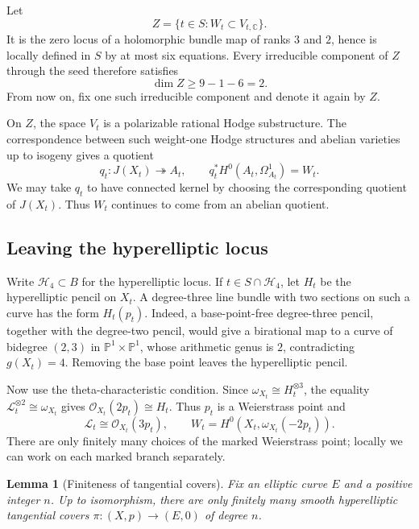 \documentclass[11pt]{amsart}
\newtheorem{lemma}{Lemma}[section]
\theoremstyle{remark}
\newcommand{\CC}{\mathbb C}
\newcommand{\PP}{\mathbb P}
\newcommand{\LL}{\mathcal L}
\numberwithin{equation}{section}
\begin{document}
Let
\[
Z=\{t\in S:W_t\subset V_{t,\CC}\}.
\]
It is the zero locus of a holomorphic bundle map of ranks $3$ and $2$,
hence is locally defined in $S$ by at most six equations. Every
irreducible component of $Z$ through the seed therefore satisfies
\begin{equation}\label{eq:lower-bound}
\dim Z\geq 9-1-6=2.
\end{equation}
From now on, fix one such irreducible component and denote it again by
$Z$.

On $Z$, the space $V_t$ is a polarizable rational Hodge substructure.
The correspondence between such weight-one Hodge structures and
abelian varieties up to isogeny gives a quotient
\[
q_t:J(X_t)\twoheadrightarrow A_t,\qquad
q_t^*H^0(A_t,\Omega_{A_t}^1)=W_t.
\]
We may take $q_t$ to have connected kernel by choosing the corresponding
quotient of $J(X_t)$. Thus $W_t$ continues to come from an abelian
quotient.

\subsection{Leaving the hyperelliptic locus}
Write $\mathcal H_4\subset B$ for the hyperelliptic locus. If
$t\in S\cap\mathcal H_4$, let $H_t$ be the hyperelliptic pencil on
$X_t$. A degree-three line bundle with two sections on such a curve
has the form $H_t(p_t)$. Indeed, a base-point-free degree-three pencil,
together with the degree-two pencil, would give a birational map to
a curve of bidegree $(2,3)$ in $\PP^1\times\PP^1$, whose arithmetic
genus is $2$, contradicting $g(X_t)=4$. Removing the base point leaves
the hyperelliptic pencil.

Now use the theta-characteristic condition. Since
$\omega_{X_t}\cong H_t^{\otimes3}$, the equality
$\LL_t^{\otimes2}\cong\omega_{X_t}$ gives
$\mathcal O_{X_t}(2p_t)\cong H_t$. Thus $p_t$ is a Weierstrass point and
\begin{equation}\label{eq:hyperelliptic-W}
\LL_t\cong\mathcal O_{X_t}(3p_t),\qquad
W_t=H^0(X_t,\omega_{X_t}(-2p_t)).
\end{equation}
There are only finitely many choices of the marked Weierstrass point;
locally we can work on each marked branch separately.

\begin{lemma}[Finiteness of tangential covers]\label{lem:finiteness}
Fix an elliptic curve $E$ and a positive integer $n$. Up to isomorphism,
there are only finitely many smooth hyperelliptic tangential covers
$\pi:(X,p)\to(E,0)$ of degree $n$.
\end{lemma}
\end{document}
